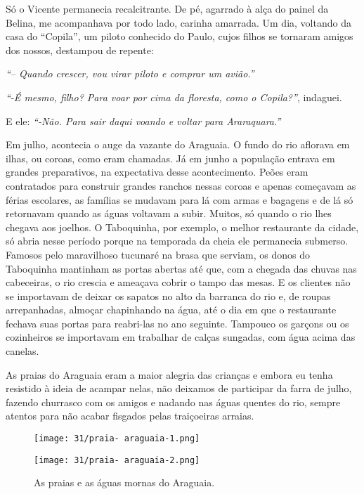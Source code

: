 Só o Vicente permanecia recalcitrante.
De pé, agarrado à alça do painel da Belina, me acompanhava por todo lado, carinha amarrada.
Um dia, voltando da casa do ``Copila'', um piloto conhecido do Paulo, cujos filhos se tornaram amigos dos nossos, destampou de repente:

\textit{``-- Quando crescer,  vou virar piloto e comprar um avião.''}

\textit{``-É mesmo, filho? Para voar por cima da floresta, como o Copila?''}, indaguei.

E ele:
\textit{``-Não.
Para sair daqui voando e voltar para Araraquara.''}

Em julho, acontecia o auge da vazante do Araguaia.
O fundo do rio aflorava em ilhas, ou coroas, como eram chamadas.
Já em junho a população entrava em grandes preparativos, na expectativa desse acontecimento.
Peões eram contratados para construir grandes ranchos nessas coroas e apenas começavam as férias escolares, as famílias se mudavam para lá com armas e bagagens e de lá só retornavam quando as águas voltavam a subir.
Muitos, só quando o rio lhes chegava aos joelhos.
O Taboquinha, por exemplo, o melhor restaurante da cidade, só abria nesse período porque na temporada da cheia ele permanecia submerso.
Famosos pelo maravilhoso tucunaré na brasa que serviam, os donos do Taboquinha mantinham as portas abertas até que, com a chegada das chuvas nas cabeceiras, o rio crescia e ameaçava cobrir o tampo das mesas.
E os clientes não se importavam de deixar os sapatos no alto da barranca do rio e, de roupas arrepanhadas, almoçar chapinhando na água, até o dia em que o restaurante fechava suas portas para reabri-las no ano seguinte.
Tampouco os garçons ou os cozinheiros se importavam em trabalhar de calças sungadas, com água acima das canelas.

As praias do Araguaia eram a maior alegria das crianças e embora eu tenha resistido à ideia de acampar nelas, não deixamos de participar da farra de julho, fazendo churrasco com os amigos e nadando nas águas quentes do rio, sempre atentos para não acabar fisgados pelas traiçoeiras arraias.

\begin{figure}
\centering
\texttt{[image: 31/praia- araguaia-1.png]}
\end{figure}

\begin{figure}\ContinuedFloat
\centering
\texttt{[image: 31/praia- araguaia-2.png]}
\caption{As praias e as águas mornas do Araguaia.}
\end{figure}


